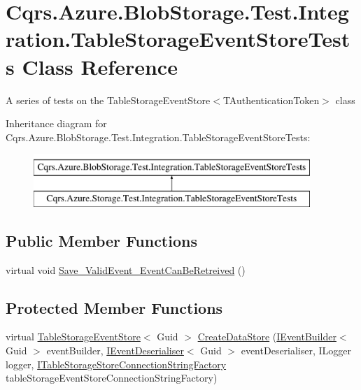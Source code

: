 \hypertarget{classCqrs_1_1Azure_1_1BlobStorage_1_1Test_1_1Integration_1_1TableStorageEventStoreTests}{}\section{Cqrs.\+Azure.\+Blob\+Storage.\+Test.\+Integration.\+Table\+Storage\+Event\+Store\+Tests Class Reference}
\label{classCqrs_1_1Azure_1_1BlobStorage_1_1Test_1_1Integration_1_1TableStorageEventStoreTests}


A series of tests on the Table\+Storage\+Event\+Store$<$\+T\+Authentication\+Token$>$ class  


Inheritance diagram for Cqrs.\+Azure.\+Blob\+Storage.\+Test.\+Integration.\+Table\+Storage\+Event\+Store\+Tests\+:\begin{figure}[H]
\begin{center}
\leavevmode
\includegraphics[height=2.000000cm]{classCqrs_1_1Azure_1_1BlobStorage_1_1Test_1_1Integration_1_1TableStorageEventStoreTests}
\end{center}
\end{figure}
\subsection*{Public Member Functions}
\begin{DoxyCompactItemize}
\item 
virtual void \hyperlink{classCqrs_1_1Azure_1_1BlobStorage_1_1Test_1_1Integration_1_1TableStorageEventStoreTests_a0f88e64f7ff8f84b308d4a8c78222b7e_a0f88e64f7ff8f84b308d4a8c78222b7e}{Save\+\_\+\+Valid\+Event\+\_\+\+Event\+Can\+Be\+Retreived} ()
\end{DoxyCompactItemize}
\subsection*{Protected Member Functions}
\begin{DoxyCompactItemize}
\item 
virtual \hyperlink{classCqrs_1_1Azure_1_1BlobStorage_1_1Events_1_1TableStorageEventStore}{Table\+Storage\+Event\+Store}$<$ Guid $>$ \hyperlink{classCqrs_1_1Azure_1_1BlobStorage_1_1Test_1_1Integration_1_1TableStorageEventStoreTests_aa2b40be10577126372049c14fd951e17_aa2b40be10577126372049c14fd951e17}{Create\+Data\+Store} (\hyperlink{interfaceCqrs_1_1Events_1_1IEventBuilder}{I\+Event\+Builder}$<$ Guid $>$ event\+Builder, \hyperlink{interfaceCqrs_1_1Events_1_1IEventDeserialiser}{I\+Event\+Deserialiser}$<$ Guid $>$ event\+Deserialiser, I\+Logger logger, \hyperlink{interfaceCqrs_1_1Azure_1_1BlobStorage_1_1ITableStorageStoreConnectionStringFactory}{I\+Table\+Storage\+Store\+Connection\+String\+Factory} table\+Storage\+Event\+Store\+Connection\+String\+Factory)
\end{DoxyCompactItemize}


